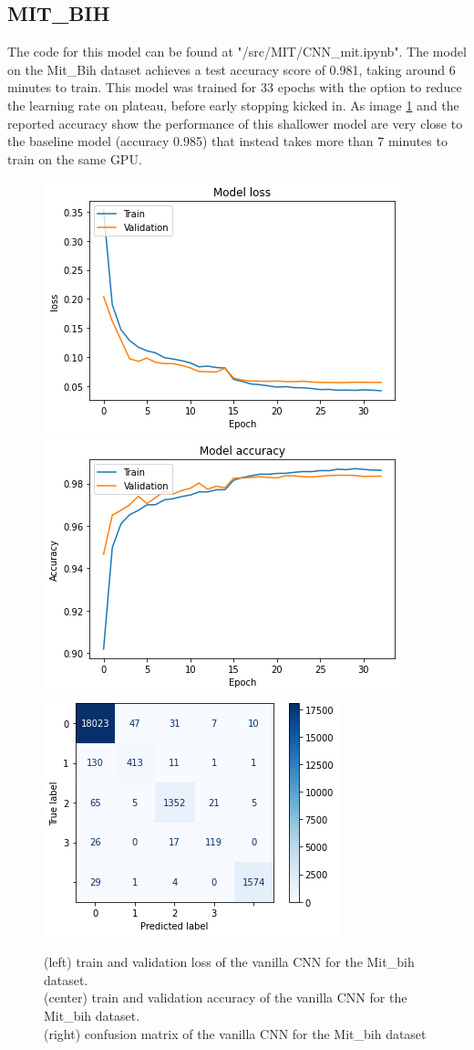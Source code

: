 \documentclass[11pt]{scrartcl}
\begin{document}
\subsection{MIT\_BIH}
The code for this model can be found at "/src/MIT/CNN\_mit.ipynb".
The model on the Mit\_Bih dataset achieves a test accuracy score of 0.981, taking around 6 minutes to train. This model was trained for 33 epochs with the option to reduce the learning rate on plateau, before early stopping kicked in.
As image \ref{fig:cnn_mit_three} and the reported accuracy show the performance of this shallower model are very close to the baseline model (accuracy 0.985)  that instead takes more than 7 minutes to train on the same GPU.
\begin{figure}[htp]
\centering
\includegraphics[width=.3\textwidth]{../models_performance_graphs/mit/CNN_mit_train_validation.png}\hfill
\includegraphics[width=.3\textwidth]{../models_performance_graphs/mit/cnn_mit_train_val_acc.png}\hfill
\includegraphics[width=.3\textwidth]{../models_performance_graphs/mit/cnn_mit_confusion.png}
\caption{(left) train and validation loss of the vanilla CNN for the Mit\_bih dataset. \\ (center) train and validation accuracy of the vanilla CNN for the Mit\_bih dataset. \\(right) confusion matrix of the vanilla CNN for the Mit\_bih dataset}
\label{fig:cnn_mit_three}
\end{figure}

\end{document}
